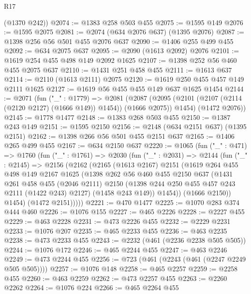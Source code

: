\begin{lexlean}{R17}
\begin{coremodule}
      (@1370 @242))
@2074 := @1383 @258 @503 @455
@2075 := @1595 @149
@2076 := @1595 @2075
@2081 := @2074 (@634 @2076 @637) (@1395 @2076)
@2087 := @1398 @256 @56 @501 @455 @2076 @637
@2090 := @1406 @255 @499 @455
@2092 := @634 @2075 @637
@2095 := @2090 (@1613 @2092) @2076
@2101 := @1619 @254 @455 @498 @149 @2092 @1625
@2107 := @1398 @252 @56 @460 @455 @2075 @637
@2110 := @1431 @251 @458 @455
@2111 := @1613 @637
@2114 := @2110 (@1613 @2111) @2075
@2120 := @1619 @250 @455 @457 @149 @2111 @1625
@2127 := @1619 @56 @455 @455 @149 @637 @1625 @1454
@2144 := @2071
    (fun ("_" : @1779) =>
    @2081
      (@2087 (@2095 (@2101 (@2107 (@2114 (@2120 @2127) (@1666 @149)) @1454)) (@1666 @2075)) @1454)
      (@1472 @2076))
@2145 := @1778 @1477
@2148 := @1383 @268 @503 @455
@2150 := @1387 @243 @149
@2151 := @1595 @2150
@2156 := @2148 (@634 @2151 @637) (@1395 @2151)
@2162 := @1398 @266 @56 @501 @455 @2151 @637
@2165 := @1406 @265 @499 @455
@2167 := @634 @2150 @637
@2220 := @1065
    (fun ("_" : @471) =>
    @1760
      (fun ("_" : @1761) =>
      @2030
        (fun ("_" : @2031) =>
        @2144
          (fun ("_" : @2145) =>
          @2156
            (@2162
              (@2165
                (@1613 @2167)
                @2151
                (@1619
                  @264
                  @455
                  @498
                  @149
                  @2167
                  @1625
                  (@1398
                    @262
                    @56
                    @460
                    @455
                    @2150
                    @637
                    (@1431
                      @261
                      @458
                      @455
                      (@2046 @2111)
                      @2150
                      (@1398 @244 @250 @455 @457 @243 @2111 (@1422 @243) @2127)
                      (@1458 @243 @149))
                    @1454))
                (@1666 @2150))
              @1454)
            (@1472 @2151)))))
@2221 := @470 @1477
@2225 := @1070 @283 @374 @444 @460
@2226 := @1076 @155
@2227 := @465 @2226
@2228 := @2227 @455
@2229 := @463 @2228
@2231 := @473 @2226 @455
@2232 := @2229 @2231
@2233 := @1076 @207
@2235 := @465 @2233 @455
@2236 := @463 @2235
@2238 := @473 @2233 @455
@2243 := @2232 (@461 (@2236 @2238 @505 @505))
@2244 := @1076 @172
@2246 := @465 @2244 @455
@2247 := @463 @2246
@2249 := @473 @2244 @455
@2256 := @723 (@461 (@2243 (@461 (@2247 @2249 @505 @505))))
@2257 := @1076 @148
@2258 := @465 @2257
@2259 := @2258 @455
@2260 := @463 @2259
@2262 := @473 @2257 @455
@2263 := @2260 @2262
@2264 := @1076 @224
@2266 := @465 @2264 @455

\end{coremodule}
\end{lexlean}
